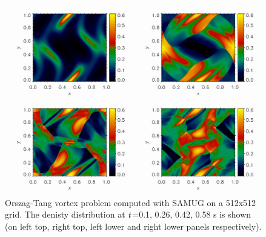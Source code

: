 
\begin{figure}[h]
\includegraphics[scale=0.8]{figure_b2_oztdens1.jpg}
\caption{Orszag-Tang vortex problem computed with SAMUG on a 512x512 grid. The denisty distribution at $\it t$=0.1, 0.26, 0.42, 0.58 s is shown (on left top, right top, left lower and right lower panels respectively).}
\end{figure}





